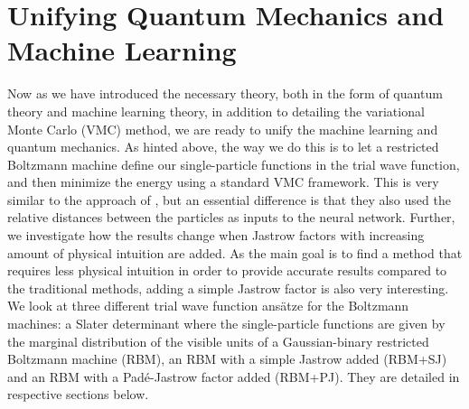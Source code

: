 \section{Unifying Quantum Mechanics and Machine Learning} \label{sec:unifying}
Now as we have introduced the necessary theory, both in the form of quantum theory and machine learning theory, in addition to detailing the variational Monte Carlo (VMC) method, we are ready to unify the machine learning and quantum mechanics. As hinted above, the way we do this is to let a restricted Boltzmann machine define our single-particle functions in the trial wave function, and then minimize the energy using a standard VMC framework. This is very similar to the approach of \citet{pfau2019abinitio}, but an essential difference is that they also used the relative distances between the particles as inputs to the neural network. Further, we investigate how the results change when Jastrow factors with increasing amount of physical intuition are added. As the main goal is to find a method that requires less physical intuition in order to provide accurate results compared to the traditional methods, adding a simple Jastrow factor is also very interesting. We look at three different trial wave function ansätze for the Boltzmann machines: a Slater determinant where the single-particle functions are given by the marginal distribution of the visible units of a Gaussian-binary restricted Boltzmann machine (RBM), an RBM with a simple Jastrow added (RBM+SJ) and an RBM with a Padé-Jastrow factor added (RBM+PJ). They are detailed in respective sections below.

